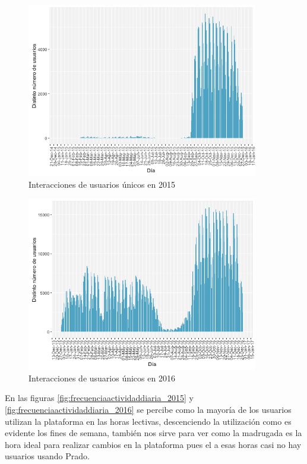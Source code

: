 \begin{figure}[H]
\centering
\includegraphics[width=0.9\textwidth]{../r/distintonumerousuarios_2015}
\caption{Interacciones de usuarios únicos en 2015}
\label{fig:distintonumerousuarios_2015}
\end{figure}

\begin{figure}[H]
\centering
\includegraphics[width=0.9\textwidth]{../r/distintonumerousuarios_2016}
\caption{Interacciones de usuarios únicos en 2016}
\label{fig:distintonumerousuarios_2016}
\end{figure}


En las figuras \ref{fig:frecuenciaactividaddiaria_2015} y \ref{fig:frecuenciaactividaddiaria_2016} se percibe como la mayoría de los usuarios utilizan la plataforma en las horas lectivas, descenciendo la utilización como es evidente los fines de semana, también nos sirve para ver como la madrugada es la hora ideal para realizar cambios en la plataforma pues el a esas horas casi no hay usuarios usando Prado.

